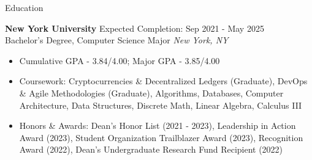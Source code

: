 \documentclass{resume} %
\begin{document}

\begin{rSection}{Education}

	\textbf{New York University} \hfill Expected Completion: Sep 2021 - May 2025\\
	Bachelor's Degree, Computer Science Major \hfill \textit{New York, NY}
	\begin{itemize}
		\item Cumulative GPA - 3.84/4.00; Major GPA - 3.85/4.00
		\item Coursework: Cryptocurrencies \& Decentralized Ledgers (Graduate), DevOps \& Agile Methodologies (Graduate),
		      Algorithms, Databases, Computer Architecture, Data Structures, Discrete Math,
		      Linear Algebra, Calculus III
		\item Honors \& Awards: Dean's Honor List (2021 - 2023), Leadership in Action Award (2023), Student Organization Trailblazer Award (2023), Recognition Award (2022), Dean's Undergraduate Research Fund Recipient (2022)
	\end{itemize}

\end{rSection}

\end{document}
